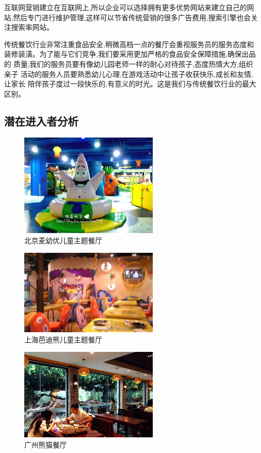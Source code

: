 互联网营销建立在互联网上,所以企业可以选择拥有更多优势网站来建立自己的网
站,然后专门进行维护管理,这样可以节省传统营销的很多广告费用,搜索引擎也会关
注搜索率网站。

传统餐饮行业非常注重食品安全,稍微高档一点的餐厅会重视服务员的服务态度和
装修装潢。为了能与它们竞争,我们要采用更加严格的食品安全保障措施,确保出品的
质量;我们的服务员要有像幼儿园老师一样的耐心对待孩子,态度热情大方;组织亲子
活动的服务人员要熟悉幼儿心理,在游戏活动中让孩子收获快乐,成长和友情,让家长
陪伴孩子度过一段快乐的,有意义的时光。这是我们与传统餐饮行业的最大区别。

\subsection{潜在进入者分析}

\begin{figure}[htbp]
        \caption{北京麦幼优儿童主题餐厅}
        \centering
        \includegraphics[width=0.6\textwidth]{../images/competitors/北京麦幼优儿童主题餐厅}
\end{figure}

\begin{figure}[htbp]
        \caption{上海芭迪熊儿童主题餐厅}
        \centering
        \includegraphics[width=0.6\textwidth]{../images/competitors/上海芭迪熊儿童主题餐厅}
\end{figure}

\begin{figure}[htbp]
        \caption{广州熊猫餐厅}
        \centering
        \includegraphics[width=0.6\textwidth]{../images/competitors/广州熊猫餐厅}
\end{figure}

